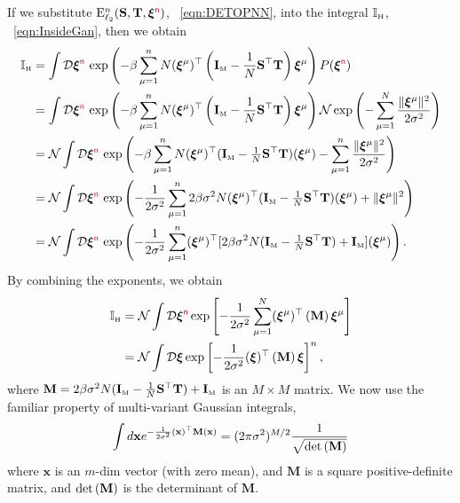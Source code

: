 If we substitute $\mathbf{\mathrm{E}}^{n}_{\ell_2}({\mathbf{S}},{\mathbf{T}}, \boldsymbol{\xi}^{{\color{red}\sf{n}}})$, \EQN~\ref{eqn:DETOPNN}, into the integral $\mathbb{I}_{\text{\tiny H}}$, \EQN~\ref{eqn:InsideGan}, then we obtain
\begin{align}
\label{eqn:I_1} 
\mathbb{I}_{\text{\tiny H}} 
  & =  \int \mathcal{D}\boldsymbol{\xi}^{{\color{red}\sf{n}}} \, \exp \left( -\beta\sum_{\mu=1}^{n} N(\boldsymbol{\xi}^{\mu})^{\top} \left(\mathbf{I}_{\text{\tiny M}}-\frac{1}{N} {\mathbf{S}}^{\top}{\mathbf{T}} \right) \boldsymbol{\xi}^{\mu} \right) P(\boldsymbol{\xi}^{{\color{red}\sf{n}}})  \\
\nonumber
  & =  \int \mathcal{D}\boldsymbol{\xi}^{{\color{red}\sf{n}}} \, \exp \left( -\beta\sum_{\mu=1}^{n} N(\boldsymbol{\xi}^{\mu})^{\top} \left(\mathbf{I}_{\text{\tiny M}}-\frac{1}{N} {\mathbf{S}}^{\top}{\mathbf{T}} \right) \boldsymbol{\xi}^{\mu} \right) \mathcal{N} \exp\left( - \sum_{\mu=1}^{N} \frac{\|\boldsymbol{\xi}^{\mu}\|^2}{2 \sigma^2} \right)  \\
    \nonumber
  &= \mathcal{N} \int \mathcal{D}\boldsymbol{\xi}^{{\color{red}\sf{n}}} \, \exp \left(
    -\beta\sum_{\mu=1}^{n} N(\boldsymbol{\xi}^{\mu})^{\top} (\mathbf{I}_{\text{\tiny M}}-\tfrac{1}{N}{\mathbf{S}}^{\top}{\mathbf{T}}) (\boldsymbol{\xi}^{\mu}) 
    - \sum_{\mu=1}^{n} \frac{\|\boldsymbol{\xi}^{\mu}\|^2}{2 \sigma^2} \right) \\ 
\nonumber
  &= \mathcal{N} \int \mathcal{D}\boldsymbol{\xi}^{{\color{red}\sf{n}}} \, \exp \left(
    -\frac{1}{2\sigma^2}\sum_{\mu=1}^{n}2\beta\sigma^{2} N(\boldsymbol{\xi}^{\mu})^{\top} (\mathbf{I}_{\text{\tiny M}}-\tfrac{1}{N}{\mathbf{S}}^{\top}{\mathbf{T}}) (\boldsymbol{\xi}^{\mu}) 
    +  \Vert\boldsymbol{\xi}^{\mu}\Vert^{2} \right) \\ 
\label{eqn:I_3} 
  &= \mathcal{N} \int \mathcal{D}\boldsymbol{\xi}^{{\color{red}\sf{n}}} \, \exp \left(
    -\frac{1}{2\sigma^2}      
      \sum_{\mu=1}^{n}
          (\boldsymbol{\xi}^{\mu})^{\top}[
      2\beta\sigma^{2}N (\mathbf{I}_{\text{\tiny M}}-\tfrac{1}{N}{\mathbf{S}}^{\top}{\mathbf{T}})+\mathbf{I}_{\text{\tiny M}}] (\boldsymbol{\xi}^{\mu})\right)  .
\end{align}
%
By combining the exponents, we obtain
\begin{align}
\nonumber
\mathbb{I}_{\text{\tiny H}}
  &=  \mathcal{N}\int \mathcal{D}\boldsymbol{\xi}^{{\color{red}\sf{n}}} 
  \exp\left[
    -\frac{1}{2\sigma^2}\sum_{\mu=1}^{N}(\boldsymbol{\xi}^{\mu})^{\top}
    \left(\mathbf{M}
    \right)
    \boldsymbol{\xi}^{\mu}
    \right ]\\ 
\label{eqn:I_4} 
  &=  \mathcal{N}\int \mathcal{D}\boldsymbol{\xi}  
 \exp\left[
    -\frac{1}{2\sigma^2}(\boldsymbol{\xi})^{\top}
    \left(\mathbf{M}
    \right)
    \boldsymbol{\xi}
    \right]^{n}   ,
\end{align}
where $\mathbf{M}=2\beta\sigma^{2}N(\mathbf{I}_{\text{\tiny M}} - \tfrac{1}{N}{\mathbf{S}}^{\top}{\mathbf{T}})+\mathbf{I}_{\text{\tiny M}}$ is an $M \times M$ matrix.
We now use the familiar property of multi-variant Gaussian integrals,
\begin{align}
\label{eqn:det_M}
\int d\mathbf{x}  e^{-\frac{1}{2\sigma^{2}}(\mathbf{x})^{\top}\mathbf{M}(\mathbf{x}) } = (2\pi\sigma^{2})^{M/2}\frac{1}{\sqrt{\mbox{}{\text{det}}\left( \mathbf{M}\right)}}
\end{align}
where $\mathbf{x}$ is an $m$-dim vector (with zero mean),
and $\mathbf{M}$ is a square positive-definite matrix, and $\mbox{}{\text{det}}\left( \mathbf{M}\right)$ is the determinant of $\mathbf{M}$.
